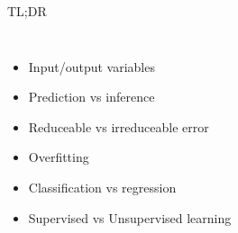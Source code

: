 \documentclass[aspectratio=169,dvipsnames]{beamer}
\newcommand{\InstructorList}[1]{
\begin{itemize}
	\color{orange}
	#1
\end{itemize}
}
\begin{document}
\begin{frame}[t]{TL;DR}
\begin{columns}
\centering


\InstructorList{
	\item Input/output variables
	\item Prediction vs inference
	\item Reduceable vs irreduceable error
	\item Overfitting
	\item Classification vs regression
	\item Supervised vs Unsupervised learning
}

\centering
\end{columns}
\end{frame}
\end{document}
